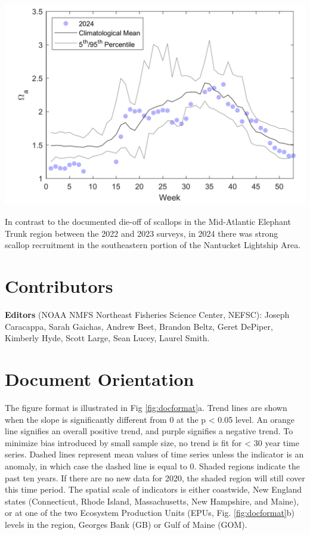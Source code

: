 \documentclass[
  10pt,
]{article}
\let\origfigure\figure
\let\endorigfigure\endfigure
\renewenvironment{figure}[1][2] {
    \expandafter\origfigure\expandafter[H]
} {
    \endorigfigure
}
\begin{document}
\begin{figure}

{\centering \includegraphics[width=22.92in]{SOE-NEFMC_files/figure-latex/GOMoa-1} 

}

\caption{GOM OA}\label{fig:GOMoa}
\end{figure}

In contrast to the documented die-off of scallops in the Mid-Atlantic Elephant Trunk region between the 2022 and 2023 surveys, in 2024 there was strong scallop recruitment in the southeastern portion of the Nantucket Lightship Area.

\hypertarget{contributors}{%
\section{Contributors}\label{contributors}}

\textbf{Editors} (NOAA NMFS Northeast Fisheries Science Center, NEFSC): Joseph Caracappa, Sarah Gaichas, Andrew Beet, Brandon Beltz, Geret DePiper, Kimberly Hyde, Scott Large, Sean Lucey, Laurel Smith.

\newpage

\hypertarget{document-orientation}{%
\section{Document Orientation}\label{document-orientation}}

The figure format is illustrated in Fig \ref{fig:docformat}a. Trend lines are shown when the slope is significantly different from 0 at the p \textless{} 0.05 level. An orange line signifies an overall positive trend, and purple signifies a negative trend. To minimize bias introduced by small sample size, no trend is fit for \textless{} 30 year time series. Dashed lines represent mean values of time series unless the indicator is an anomaly, in which case the dashed line is equal to 0. Shaded regions indicate the past ten years. If there are no new data for 2020, the shaded region will still cover this time period. The spatial scale of indicators is either coastwide, New England states (Connecticut, Rhode Island, Massachusetts, New Hampshire, and Maine), or at one of the two Ecosystem Production Units (EPUs, Fig. \ref{fig:docformat}b) levels in the region, Georges Bank (GB) or Gulf of Maine (GOM).
\end{document}
